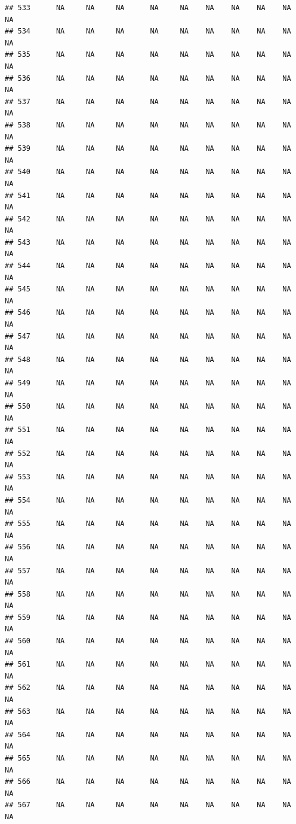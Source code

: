 \documentclass{article}\usepackage{graphicx, color}
\makeatletter
\newenvironment{kframe}{%
 \def\at@end@of@kframe{}%
 \ifinner\ifhmode%
  \def\at@end@of@kframe{\end{minipage}}%
  \begin{minipage}{\columnwidth}%
 \fi\fi%
 \def\FrameCommand##1{\hskip\@totalleftmargin \hskip-\fboxsep
 \colorbox{shadecolor}{##1}\hskip-\fboxsep
     \hskip-\linewidth \hskip-\@totalleftmargin \hskip\columnwidth}%
 \MakeFramed {\advance\hsize-\width
   \@totalleftmargin\z@ \linewidth\hsize
   \@setminipage}}%
 {\par\unskip\endMakeFramed%
 \at@end@of@kframe}
\newenvironment{knitrout}{}{} %
\makeatother
\begin{document}
\begin{knitrout}
\begin{kframe}
\begin{verbatim}
## 533      NA     NA     NA      NA     NA    NA    NA    NA    NA     NA
## 534      NA     NA     NA      NA     NA    NA    NA    NA    NA     NA
## 535      NA     NA     NA      NA     NA    NA    NA    NA    NA     NA
## 536      NA     NA     NA      NA     NA    NA    NA    NA    NA     NA
## 537      NA     NA     NA      NA     NA    NA    NA    NA    NA     NA
## 538      NA     NA     NA      NA     NA    NA    NA    NA    NA     NA
## 539      NA     NA     NA      NA     NA    NA    NA    NA    NA     NA
## 540      NA     NA     NA      NA     NA    NA    NA    NA    NA     NA
## 541      NA     NA     NA      NA     NA    NA    NA    NA    NA     NA
## 542      NA     NA     NA      NA     NA    NA    NA    NA    NA     NA
## 543      NA     NA     NA      NA     NA    NA    NA    NA    NA     NA
## 544      NA     NA     NA      NA     NA    NA    NA    NA    NA     NA
## 545      NA     NA     NA      NA     NA    NA    NA    NA    NA     NA
## 546      NA     NA     NA      NA     NA    NA    NA    NA    NA     NA
## 547      NA     NA     NA      NA     NA    NA    NA    NA    NA     NA
## 548      NA     NA     NA      NA     NA    NA    NA    NA    NA     NA
## 549      NA     NA     NA      NA     NA    NA    NA    NA    NA     NA
## 550      NA     NA     NA      NA     NA    NA    NA    NA    NA     NA
## 551      NA     NA     NA      NA     NA    NA    NA    NA    NA     NA
## 552      NA     NA     NA      NA     NA    NA    NA    NA    NA     NA
## 553      NA     NA     NA      NA     NA    NA    NA    NA    NA     NA
## 554      NA     NA     NA      NA     NA    NA    NA    NA    NA     NA
## 555      NA     NA     NA      NA     NA    NA    NA    NA    NA     NA
## 556      NA     NA     NA      NA     NA    NA    NA    NA    NA     NA
## 557      NA     NA     NA      NA     NA    NA    NA    NA    NA     NA
## 558      NA     NA     NA      NA     NA    NA    NA    NA    NA     NA
## 559      NA     NA     NA      NA     NA    NA    NA    NA    NA     NA
## 560      NA     NA     NA      NA     NA    NA    NA    NA    NA     NA
## 561      NA     NA     NA      NA     NA    NA    NA    NA    NA     NA
## 562      NA     NA     NA      NA     NA    NA    NA    NA    NA     NA
## 563      NA     NA     NA      NA     NA    NA    NA    NA    NA     NA
## 564      NA     NA     NA      NA     NA    NA    NA    NA    NA     NA
## 565      NA     NA     NA      NA     NA    NA    NA    NA    NA     NA
## 566      NA     NA     NA      NA     NA    NA    NA    NA    NA     NA
## 567      NA     NA     NA      NA     NA    NA    NA    NA    NA     NA

\end{verbatim}
\end{kframe}
\end{knitrout}
\end{document}
